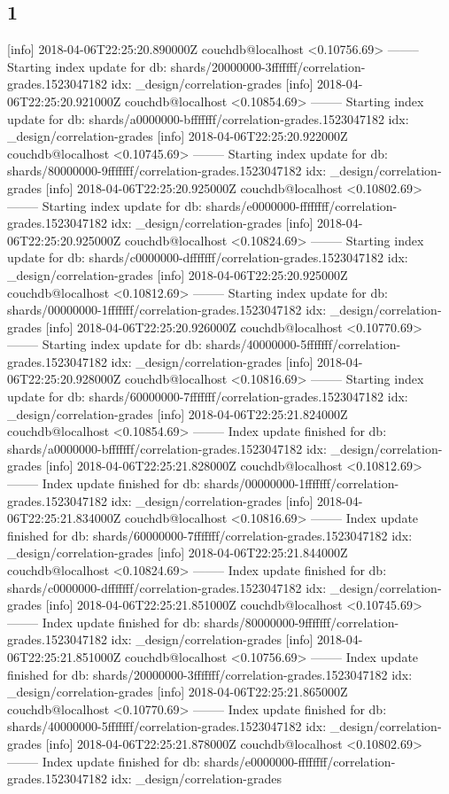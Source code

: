 \subsection{1}
[info] 2018-04-06T22:25:20.890000Z couchdb@localhost <0.10756.69> -------- Starting index update for db: shards/20000000-3fffffff/correlation-grades.1523047182 idx: _design/correlation-grades
[info] 2018-04-06T22:25:20.921000Z couchdb@localhost <0.10854.69> -------- Starting index update for db: shards/a0000000-bfffffff/correlation-grades.1523047182 idx: _design/correlation-grades
[info] 2018-04-06T22:25:20.922000Z couchdb@localhost <0.10745.69> -------- Starting index update for db: shards/80000000-9fffffff/correlation-grades.1523047182 idx: _design/correlation-grades
[info] 2018-04-06T22:25:20.925000Z couchdb@localhost <0.10802.69> -------- Starting index update for db: shards/e0000000-ffffffff/correlation-grades.1523047182 idx: _design/correlation-grades
[info] 2018-04-06T22:25:20.925000Z couchdb@localhost <0.10824.69> -------- Starting index update for db: shards/c0000000-dfffffff/correlation-grades.1523047182 idx: _design/correlation-grades
[info] 2018-04-06T22:25:20.925000Z couchdb@localhost <0.10812.69> -------- Starting index update for db: shards/00000000-1fffffff/correlation-grades.1523047182 idx: _design/correlation-grades
[info] 2018-04-06T22:25:20.926000Z couchdb@localhost <0.10770.69> -------- Starting index update for db: shards/40000000-5fffffff/correlation-grades.1523047182 idx: _design/correlation-grades
[info] 2018-04-06T22:25:20.928000Z couchdb@localhost <0.10816.69> -------- Starting index update for db: shards/60000000-7fffffff/correlation-grades.1523047182 idx: _design/correlation-grades
[info] 2018-04-06T22:25:21.824000Z couchdb@localhost <0.10854.69> -------- Index update finished for db: shards/a0000000-bfffffff/correlation-grades.1523047182 idx: _design/correlation-grades
[info] 2018-04-06T22:25:21.828000Z couchdb@localhost <0.10812.69> -------- Index update finished for db: shards/00000000-1fffffff/correlation-grades.1523047182 idx: _design/correlation-grades
[info] 2018-04-06T22:25:21.834000Z couchdb@localhost <0.10816.69> -------- Index update finished for db: shards/60000000-7fffffff/correlation-grades.1523047182 idx: _design/correlation-grades
[info] 2018-04-06T22:25:21.844000Z couchdb@localhost <0.10824.69> -------- Index update finished for db: shards/c0000000-dfffffff/correlation-grades.1523047182 idx: _design/correlation-grades
[info] 2018-04-06T22:25:21.851000Z couchdb@localhost <0.10745.69> -------- Index update finished for db: shards/80000000-9fffffff/correlation-grades.1523047182 idx: _design/correlation-grades
[info] 2018-04-06T22:25:21.851000Z couchdb@localhost <0.10756.69> -------- Index update finished for db: shards/20000000-3fffffff/correlation-grades.1523047182 idx: _design/correlation-grades
[info] 2018-04-06T22:25:21.865000Z couchdb@localhost <0.10770.69> -------- Index update finished for db: shards/40000000-5fffffff/correlation-grades.1523047182 idx: _design/correlation-grades
[info] 2018-04-06T22:25:21.878000Z couchdb@localhost <0.10802.69> -------- Index update finished for db: shards/e0000000-ffffffff/correlation-grades.1523047182 idx: _design/correlation-grades

